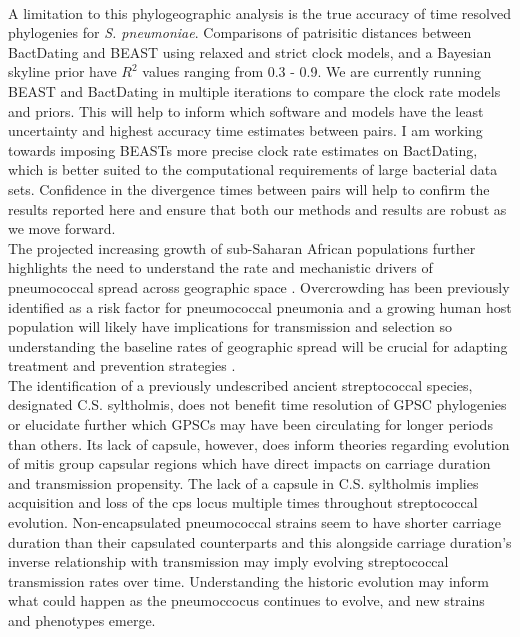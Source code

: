 \documentclass{article}
\begin{document}
 \\A limitation to this phylogeographic analysis is the true accuracy of time resolved phylogenies for \textit{S. pneumoniae}. Comparisons of patrisitic distances between BactDating and BEAST using relaxed and strict clock models, and a Bayesian skyline prior have $R^2$ values ranging from 0.3 - 0.9.  We are currently running BEAST and BactDating in multiple iterations to compare the clock rate models and priors. This will help to inform which software and models have the least uncertainty and highest accuracy time estimates between pairs. I am working towards imposing BEASTs more precise clock rate estimates on BactDating, which is better suited to the computational requirements of large bacterial data sets. Confidence in the divergence times between pairs will help to confirm the results reported here and ensure that both our methods and results are robust as we move forward. \\The projected increasing growth of sub-Saharan African populations further highlights the need to understand the rate and mechanistic drivers of pneumococcal spread across geographic space \cite{abubakarFutureMigrationHuman2020a}. Overcrowding has been previously identified as a risk factor for pneumococcal pneumonia and a growing human host population will likely have implications for transmission and selection so understanding the baseline rates of geographic spread will be crucial for adapting treatment and prevention strategies \cite{veraniRiskFactorsPresumed2016}. \\The identification of a previously undescribed ancient streptococcal species, designated  C.S. syltholmis, does not benefit time resolution of GPSC phylogenies or elucidate further which GPSCs may have been circulating for longer periods than others. Its lack of capsule, however, does inform theories regarding evolution of mitis group capsular regions which have direct impacts on carriage duration and transmission propensity. The lack of a capsule in C.S. syltholmis implies acquisition and loss of the cps locus multiple times throughout streptococcal evolution. Non-encapsulated pneumococcal strains seem to have shorter carriage duration than their capsulated counterparts and this alongside carriage duration's inverse relationship with transmission may imply evolving streptococcal transmission rates over time\cite{bradshawSelectivePressureRise2019,
bradshawTransformationNonencapsulatedStreptococcus2020}. Understanding the historic evolution may inform what could happen as the pneumoccocus continues to evolve, and new strains and phenotypes emerge.
\end{document}
